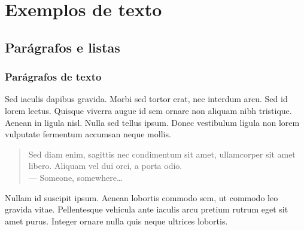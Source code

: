 \section{Exemplos de texto} %


\subsection{Parágrafos e listas}

\begin{frame}
	\frametitle{Parágrafos de texto}
	
	Sed iaculis \alert{dapibus gravida}. Morbi sed tortor erat, nec interdum arcu. Sed id lorem lectus. Quisque viverra augue id sem ornare non aliquam nibh tristique. Aenean in ligula nisl. Nulla sed tellus ipsum. Donec vestibulum ligula non lorem vulputate fermentum accumsan neque mollis.
	
	\bigskip %
	
	\begin{quote}
		Sed diam enim, sagittis nec condimentum sit amet, ullamcorper sit amet libero. Aliquam vel dui orci, a porta odio.\\
		--- Someone, somewhere\ldots
	\end{quote}
	
	\bigskip %
	
	Nullam id suscipit ipsum. Aenean lobortis commodo sem, ut commodo leo gravida vitae. Pellentesque vehicula ante iaculis arcu pretium rutrum eget sit amet purus. Integer ornare nulla quis neque ultrices lobortis.
\end{frame}


